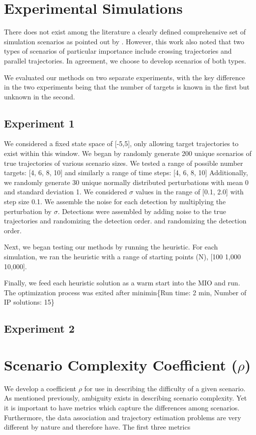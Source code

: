 \documentclass[journal]{IEEEtran}
\begin{document}
\section{Experimental Simulations}
There does not exist among the literature a clearly defined comprehensive set of simulation scenarios as pointed out by \cite{MTT-Taxonomy}.  However, this work also noted that two types of scenarios of particular importance include crossing trajectories and parallel trajectories. In agreement, we choose to develop scenarios of both types. 

We evaluated our methods on two separate experiments, with the key difference in the two experiments being that the number of targets is known in the first but unknown in the second.



\subsection{Experiment 1}
We considered a fixed state space of [-5,5], only allowing target trajectories to exist within this window. We began by randomly generate 200 unique scenarios of true trajectories of various scenario sizes. We tested a range of possible number targets: [4, 6, 8, 10] and similarly a range of time steps: [4, 6, 8, 10]
Additionally, we randomly generate 30 unique normally distributed perturbations with mean 0 and standard deviation 1. We considered $\sigma$ values in the range of [0.1, 2.0] with step size 0.1. We assemble the noise for each detection by multiplying the perturbation by $\sigma$. Detections were assembled by adding noise to the true trajectories and randomizing the detection order. and randomizing the detection order. 

Next, we began testing our methods by running the heuristic. For each simulation, we ran the heuristic with a range of starting points (N), [100 1,000 10,000].

Finally, we feed each heuristic solution as a warm start into the MIO and run.  The optimization process was exited after minimin\{Run time: 2 min, Number of IP solutions: 15\}

\subsection{Experiment 2}

\section{Scenario Complexity Coefficient ($\rho$)}
We develop a coefficient $\rho$ for use in describing the difficulty of a given scenario. As mentioned previously, ambiguity exists in describing scenario complexity. Yet it is important to have metrics which capture the differences among scenarios. Furthermore, the data association and trajectory estimation problems are very different by nature and therefore have. The first three metrics 
\end{document}
